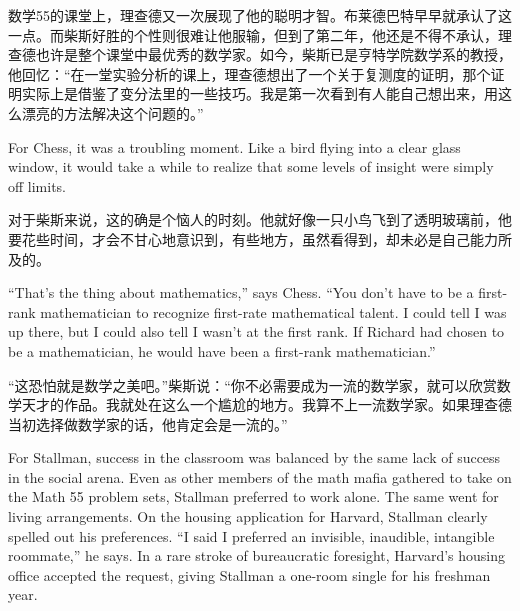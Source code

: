 \ifdefined\chs
数学55的课堂上，理查德又一次展现了他的聪明才智。布莱德巴特早早就承认了这一点。而柴斯好胜的个性则很难让他服输，但到了第二年，他还是不得不承认，理查德也许是整个课堂中最优秀的数学家。如今，柴斯已是亨特学院数学系的教授，他回忆：``在一堂实验分析的课上，理查德想出了一个关于复测度的证明，那个证明实际上是借鉴了变分法里的一些技巧。我是第一次看到有人能自己想出来，用这么漂亮的方法解决这个问题的。''
\fi

\ifdefined\eng
For Chess, it was a troubling moment. Like a bird flying into a clear glass window, it would take a while to realize that some levels of insight were simply off limits.
\fi

\ifdefined\chs
对于柴斯来说，这的确是个恼人的时刻。他就好像一只小鸟飞到了透明玻璃前，他要花些时间，才会不甘心地意识到，有些地方，虽然看得到，却未必是自己能力所及的。
\fi

\ifdefined\eng
``That's the thing about mathematics,'' says Chess. ``You don't have to be a first-rank mathematician to recognize first-rate mathematical talent. I could tell I was up there, but I could also tell I wasn't at the first rank. If Richard had chosen to be a mathematician, he would have been a first-rank mathematician.''
\fi

\ifdefined\chs
``这恐怕就是数学之美吧。''柴斯说：``你不必需要成为一流的数学家，就可以欣赏数学天才的作品。我就处在这么一个尴尬的地方。我算不上一流数学家。如果理查德当初选择做数学家的话，他肯定会是一流的。''
\fi

\ifdefined\eng
For Stallman, success in the classroom was balanced by the same lack of success in the social arena. Even as other members of the math mafia gathered to take on the Math 55 problem sets, Stallman preferred to work alone. The same went for living arrangements. On the housing application for Harvard, Stallman clearly spelled out his preferences. ``I said I preferred an invisible, inaudible, intangible roommate,'' he says. In a rare stroke of bureaucratic foresight, Harvard's housing office accepted the request, giving Stallman a one-room single for his freshman year.
\fi


